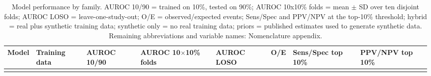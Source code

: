 \documentclass[journal]{IEEEtran}
\begin{document}
{\footnotesize
\begin{longtable}[]{@{}
  >{\raggedright\arraybackslash}p{}
  >{\raggedright\arraybackslash}p{}
  >{\raggedright\arraybackslash}p{}
  >{\raggedright\arraybackslash}p{}
  >{\raggedright\arraybackslash}p{}
  >{\raggedright\arraybackslash}p{}
  >{\raggedright\arraybackslash}p{}
  >{\raggedright\arraybackslash}p{}@{}}
\caption{Model performance by family. AUROC 10/90 = trained on 10\%,
tested on 90\%; AUROC 10x10\% folds = mean \ensuremath{\pm} SD over ten disjoint folds;
AUROC LOSO = leave-one-study-out; O/E = observed/expected events;
Sens/Spec and PPV/NPV at the top-10\% threshold; hybrid = real plus
synthetic training data; synthetic only = no real training data; priors
= published estimates used to generate synthetic data. Remaining
abbreviations and variable names: Nomenclature
appendix.\label{tbl:models}}\tabularnewline
\toprule\noalign{}
\begin{minipage}[b]{\linewidth}\raggedright
Model
\end{minipage} & \begin{minipage}[b]{\linewidth}\raggedright
Training data
\end{minipage} & \begin{minipage}[b]{\linewidth}\raggedright
AUROC 10/90
\end{minipage} & \begin{minipage}[b]{\linewidth}\raggedright
AUROC 10\ensuremath{\times}10\% folds
\end{minipage} & \begin{minipage}[b]{\linewidth}\raggedright
AUROC LOSO
\end{minipage} & \begin{minipage}[b]{\linewidth}\raggedright
O/E
\end{minipage} & \begin{minipage}[b]{\linewidth}\raggedright
Sens/Spec top 10\%
\end{minipage} & \begin{minipage}[b]{\linewidth}\raggedright
PPV/NPV top 10\%
\end{minipage} \\
\midrule\noalign{}
\endfirsthead
\toprule\noalign{}
\begin{minipage}[b]{\linewidth}\raggedright

\end{minipage}
\end{longtable}}
\end{document}
